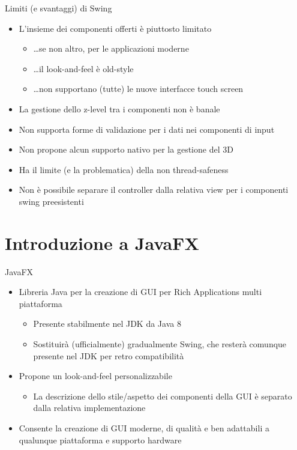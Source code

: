 \documentclass[presentation]{beamer}
\begin{document}
\begin{frame}{Limiti (e svantaggi) di Swing}
\begin{itemize}\itemsep10pt
\item L'insieme dei componenti offerti è piuttosto limitato
\begin{itemize}
\item \dots se non altro, per le applicazioni moderne
\item \dots il look-and-feel è old-style
\item \dots non supportano (tutte) le nuove interfacce touch screen
\end{itemize}
\item La gestione dello z-level tra i componenti non è banale
\item Non supporta forme di validazione per i dati nei componenti di input
\item Non propone alcun supporto nativo per la gestione del 3D
\item Ha il limite (e la problematica) della non thread-safeness
\item Non è possibile separare il controller dalla relativa view per i componenti swing preesistenti
\end{itemize}
\end{frame}

\section{Introduzione a JavaFX}

\begin{frame}{JavaFX}
\begin{itemize}\itemsep20pt
\item Libreria Java per la creazione di GUI per Rich Applications multi piattaforma
\begin{itemize}
\item Presente stabilmente nel JDK da Java 8
\item Sostituirà (ufficialmente) gradualmente Swing, che resterà comunque presente nel JDK per retro compatibilità
\end{itemize}
\item Propone un look-and-feel personalizzabile
\begin{itemize}
\item La descrizione dello stile/aspetto dei componenti della GUI è separato dalla relativa implementazione
\end{itemize}
\item Consente la creazione di GUI moderne, di qualità e ben adattabili a qualunque piattaforma e supporto hardware
\end{itemize}
\end{frame}
\end{document}
